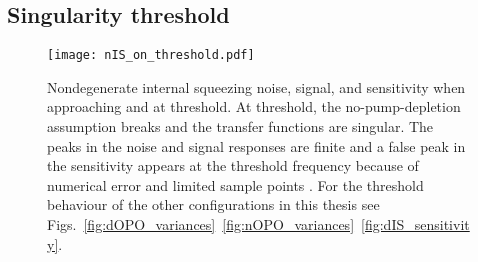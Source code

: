 
\subsection{Singularity threshold}
\label{sec:singularity_threshold}


\begin{figure}
    \centering
    \texttt{[image: nIS\_on\_threshold.pdf]}
    \caption{ Nondegenerate internal squeezing noise, signal, and sensitivity when approaching and at threshold. At threshold, the no-pump-depletion assumption breaks and the transfer functions are singular. The peaks in the noise and signal responses are finite and a false peak in the sensitivity appears at the threshold frequency because of numerical error and limited sample points . For the threshold behaviour of the other configurations in this thesis see Figs.~\ref{fig:dOPO_variances}~\ref{fig:nOPO_variances}~\ref{fig:dIS_sensitivity}.}
    \label{fig:nIS_on_threshold}
\end{figure}


